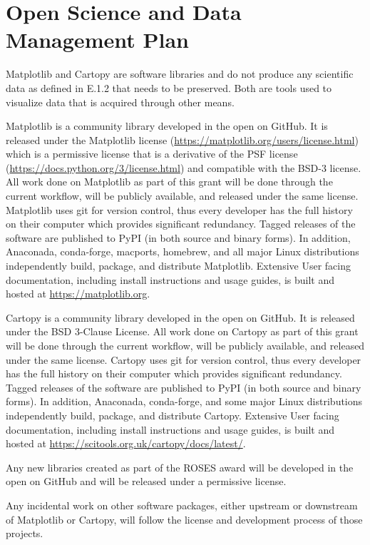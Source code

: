 \documentclass[12pt]{article}
\numberwithin{page}{section}
\begin{document}
\section{Open Science and Data Management Plan}
\setcounter{page}{1}

Matplotlib and Cartopy are software libraries and do not produce any scientific
data as defined in E.1.2 that needs to be preserved.  Both are tools used to
visualize data that is acquired through other means.

Matplotlib is a community library developed in the open on GitHub.
It is released under the Matplotlib license
(\url{https://matplotlib.org/users/license.html}) which is a permissive
license that is a derivative of the PSF license
(\url{https://docs.python.org/3/license.html}) and compatible with the
BSD-3 license.  All work done on Matplotlib as part of this grant will
be done through the current workflow, will be publicly available, and
released under the same license.  Matplotlib uses git for version
control, thus every developer has the full history on their computer
which provides significant redundancy.  Tagged releases of the
software are published to PyPI (in both source and binary forms).  In
addition, Anaconada, conda-forge, macports, homebrew, and all major Linux
distributions independently build, package, and distribute Matplotlib.
Extensive User facing documentation, including install instructions
and usage guides, is built and hosted at \url{https://matplotlib.org}.

Cartopy is a community library developed in the open on GitHub.  It is released
under the BSD 3-Clause License.  All work done on Cartopy as part of this grant
will be done through the current workflow, will be publicly available, and
released under the same license.  Cartopy uses git for version control, thus
every developer has the full history on their computer which provides
significant redundancy.  Tagged releases of the software are published to PyPI
(in both source and binary forms).
In addition, Anaconada, conda-forge, and some major Linux
distributions independently build, package, and distribute Cartopy.
Extensive User facing documentation, including install instructions and usage
guides, is built and hosted at
\url{https://scitools.org.uk/cartopy/docs/latest/}.

Any new libraries created as part of the ROSES award will be developed
in the open on GitHub and will be released under a permissive license.

Any incidental work on other software packages, either upstream or
downstream of Matplotlib or Cartopy, will follow the license and development
process of those projects.
\end{document}
